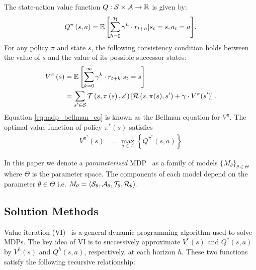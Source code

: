 The state-action value function $Q : \mathcal{S} \times \mathcal{A} \rightarrow \mathbb{R}$ is given by:
{\footnotesize 
    \abovedisplayskip=0pt
    \belowdisplayskip=0pt
\begin{align}
    \label{eq:mdp_qfunc}
    Q^{\pi}\left(s, a\right) = {\mathbb{E}\left[{\sum\limits_{h = 0}^{\mathcal{H}} \gamma^h \cdot r_{t + h} | s_t = s, a_t = a}\right]}.
\end{align}
}
For any policy $\pi$ and state $s$, the following consistency condition holds between the value of $s$ and the value of its possible successor states:
{\footnotesize 
    \abovedisplayskip=0pt
    \belowdisplayskip=0pt
\begin{align}
    V^{\pi}\left(s\right)  &= {\mathbb{E}\left[{\sum\limits_{k = 0}^{\infty} \gamma^k \cdot r_{t + k} | s_t = s}\right]} \nonumber \\
    &= \sum\limits_{s' \in \mathcal{S}}  \mathcal{T}\left(s, \pi\left(s\right), s' \right) \left[ \mathcal{R}\left(s, \pi(s), s'\right) + \gamma \cdot V^{\pi}(s')\right]. \label{eq:mdp_bellman_eq}
\end{align}
}
Equation \eqref{eq:mdp_bellman_eq} is known as the Bellman equation for $V^{\pi}$. The optimal value function of policy $ \pi^{*}(s) $ satisfies
{\footnotesize 
    \abovedisplayskip=0pt
    \belowdisplayskip=0pt
    \begin{align}
        V^{\pi^{*}}(s) &= \max_{a \in A} \left\{ Q^{\pi^{*}}(s, a) \right\} \label{eq:opt_vfunc}
    \end{align}
}%

In this paper we denote a \textit{parameterized} MDP~\parencite{Dearden_UAI_1999} as a family of models $ \lbrace M_\theta \rbrace_{\theta \in \Theta} $ where $ \Theta $ is the parameter space. The components of each model depend on the parameter $ \theta \in \Theta $ i.e. 
$ M_\theta = \langle \mathcal{S}_\theta, \mathcal{A}_\theta, \mathcal{T}_\theta, \mathcal{R}_\theta \rangle $.

\subsection{Solution Methods}

Value iteration (VI)~\parencite{Bellman_PU_1957} is a general dynamic programming algorithm used to solve MDPs. The key idea of VI is to successively approximate {\footnotesize $V^{*}(s)$} and {\footnotesize $Q^{*}(s, a)$}
by {\footnotesize $V^{h}(s)$} and {\footnotesize $Q^{h}(s, a)$}, respectively, at each horizon $h$. These two functions satisfy the following recursive relationship:

